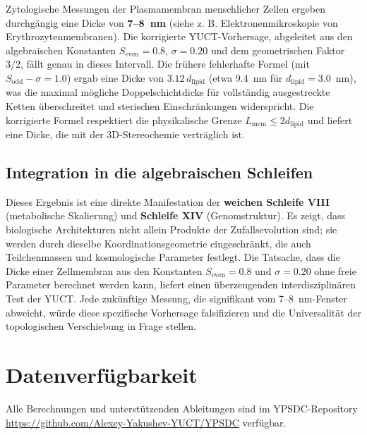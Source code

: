 \documentclass[12pt,a4paper]{article}
\begin{document}
	Zytologische Messungen der Plasmamembran menschlicher Zellen ergeben durchgängig eine Dicke von \textbf{7–8~nm} (siehe z. B. Elektronenmikroskopie von Erythrozytenmembranen). Die korrigierte YUCT-Vorhersage, abgeleitet aus den algebraischen Konstanten \(S_{\mathrm{even}} = 0.8\), \(\sigma = 0.20\) und dem geometrischen Faktor \(3/2\), fällt genau in dieses Intervall. Die frühere fehlerhafte Formel (mit \(S_{\mathrm{odd}}-\sigma = 1.0\)) ergab eine Dicke von \(3.12 \, d_{\mathrm{lipid}}\) (etwa 9.4~nm für \(d_{\mathrm{lipid}}=3.0\)~nm), was die maximal mögliche Doppelschichtdicke für vollständig ausgestreckte Ketten überschreitet und sterischen Einschränkungen widerspricht. Die korrigierte Formel respektiert die physikalische Grenze \(L_{\mathrm{mem}} \le 2 d_{\mathrm{lipid}}\) und liefert eine Dicke, die mit der 3D-Stereochemie verträglich ist.
	
	\subsection*{Integration in die algebraischen Schleifen}
	
	Dieses Ergebnis ist eine direkte Manifestation der \textbf{weichen Schleife VIII} (metabolische Skalierung) und \textbf{Schleife XIV} (Genomstruktur). Es zeigt, dass biologische Architekturen nicht allein Produkte der Zufallsevolution sind; sie werden durch dieselbe Koordinationsgeometrie eingeschränkt, die auch Teilchenmassen und kosmologische Parameter festlegt. Die Tatsache, dass die Dicke einer Zellmembran aus den Konstanten \(S_{\mathrm{even}} = 0.8\) und \(\sigma = 0.20\) ohne freie Parameter berechnet werden kann, liefert einen überzeugenden interdisziplinären Test der YUCT. Jede zukünftige Messung, die signifikant vom 7–8~nm-Fenster abweicht, würde diese spezifische Vorhersage falsifizieren und die Universalität der topologischen Verschiebung in Frage stellen.
	
	\section*{Datenverfügbarkeit}
	Alle Berechnungen und unterstützenden Ableitungen sind im YPSDC-Repository \url{https://github.com/Alexey-Yakushev-YUCT/YPSDC} verfügbar.
	
\end{document}
